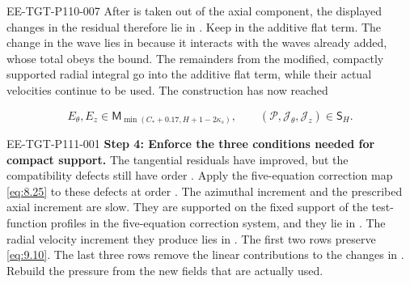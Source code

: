 \begin{EESegment}{EE-TGT-P110-007}
After  is taken out of the axial component, the
displayed changes in the residual therefore lie in
. Keep
 in the additive flat term. The change in the wave
lies in  because it interacts with the waves already added, whose
total obeys the  bound. The remainders from the modified,
compactly supported radial integral go into the additive flat term, while their actual velocities
continue to be used. The construction has now reached
\end{EESegment}
\[
E_\theta,E_z\in \mathsf M_{\min(C_*+0.17,H+1-2\kappa_s)},
\qquad
(\mathcal P,\mathcal J_\theta,\mathcal J_z)\in \mathsf S_H.
\]
%
\begin{EESegment}{EE-TGT-P111-001}
\noindent\textbf{Step 4: Enforce the three conditions needed for compact support.} The tangential
residuals have improved, but the compatibility defects still have order
. Apply the five-equation correction map \eqref{eq:8.25} to these defects
at order . The azimuthal increment and the prescribed axial increment are
slow. They are supported on the fixed support of the test-function profiles in the five-equation
correction system, and they lie in . The radial velocity
increment they produce lies in . The first two rows preserve
\eqref{eq:9.10}. The last three rows remove the linear contributions to the changes in
. Rebuild the pressure from the
new fields that are actually used.
\end{EESegment}


